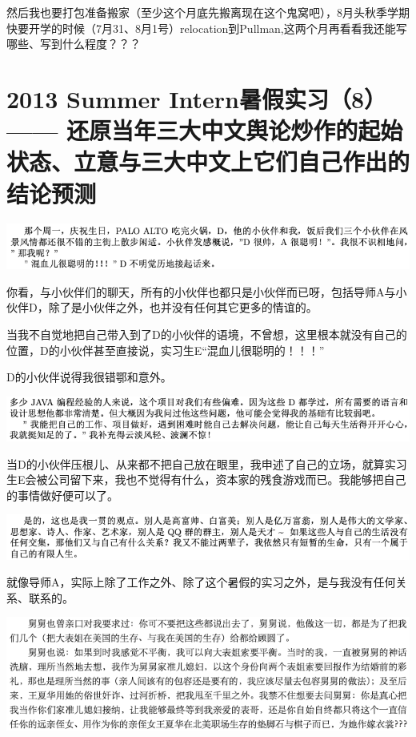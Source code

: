 \documentclass[9pt, b5paper]{article}
\begin{document}
然后我也要打包准备搬家（至少这个月底先搬离现在这个鬼窝吧），8月头秋季学期快要开学的时候（7月31、8月1号）relocation到Pullman,这两个月再看看我还能写哪些、写到什么程度？？？

\section{2013 Summer Intern暑假实习（8）—— 还原当年三大中文舆论炒作的起始状态、立意与三大中文上它们自己作出的结论预测}
\label{sec:orgb804b69}

\begin{center}
\includegraphics[width=.9\linewidth]{./pic/backups_plans_20210514_121334.png}
\end{center}

你看，与小伙伴们的聊天，所有的小伙伴也都只是小伙伴而已呀，包括导师A与小伙伴D，除了是小伙伴之外，也并没有任何其它更多的情谊的。 

当我不自觉地把自己带入到了D的小伙伴的语境，不曾想，这里根本就没有自己的位置，D的小伙伴甚至直接说，实习生E“混血儿很聪明的！！！”

D的小伙伴说得我很错鄂和意外。 

\begin{center}
\includegraphics[width=.9\linewidth]{./pic/backups_plans_20210514_121704.png}
\end{center}

当D的小伙伴压根儿、从来都不把自己放在眼里，我申述了自己的立场，就算实习生E会被公司留下来，我也不觉得有什么，资本家的残食游戏而已。我能够把自己的事情做好便可以了。 

\begin{center}
\includegraphics[width=.9\linewidth]{./pic/backups_plans_20210514_122038.png}
\end{center}

就像导师A，实际上除了工作之外、除了这个暑假的实习之外，是与我没有任何关系、联系的。

\begin{center}
\includegraphics[width=.9\linewidth]{./pic/backups_plans_20210514_222850.png}
\end{center}
\end{document}
